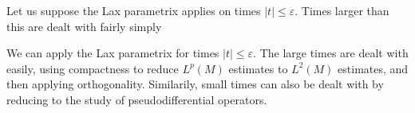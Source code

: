 Let us suppose the Lax parametrix applies on times $|t| \leq \varepsilon$. Times larger than this are dealt with fairly simply

We can apply the Lax parametrix for times $|t| \leq \varepsilon$. The large times are dealt with easily, using compactness to reduce $L^p(M)$ estimates to $L^2(M)$ estimates, and then applying orthogonality. Similarily, small times can also be dealt with by reducing to the study of pseudodifferential operators.















%
%
%










